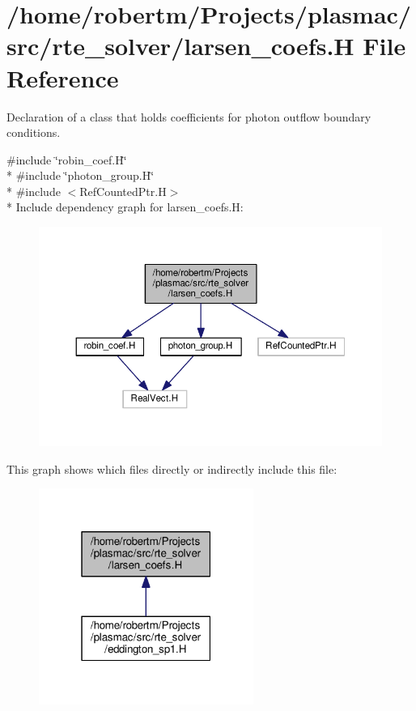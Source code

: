 \hypertarget{larsen__coefs_8H}{}\section{/home/robertm/\+Projects/plasmac/src/rte\+\_\+solver/larsen\+\_\+coefs.H File Reference}
\label{larsen__coefs_8H}


Declaration of a class that holds coefficients for photon outflow boundary conditions.  


{\ttfamily \#include \char`\"{}robin\+\_\+coef.\+H\char`\"{}}\\*
{\ttfamily \#include \char`\"{}photon\+\_\+group.\+H\char`\"{}}\\*
{\ttfamily \#include $<$Ref\+Counted\+Ptr.\+H$>$}\\*
Include dependency graph for larsen\+\_\+coefs.\+H\+:\nopagebreak
\begin{figure}[H]
\begin{center}
\leavevmode
\includegraphics[width=350pt]{larsen__coefs_8H__incl}
\end{center}
\end{figure}
This graph shows which files directly or indirectly include this file\+:\nopagebreak
\begin{figure}[H]
\begin{center}
\leavevmode
\includegraphics[width=199pt]{larsen__coefs_8H__dep__incl}
\end{center}
\end{figure}
